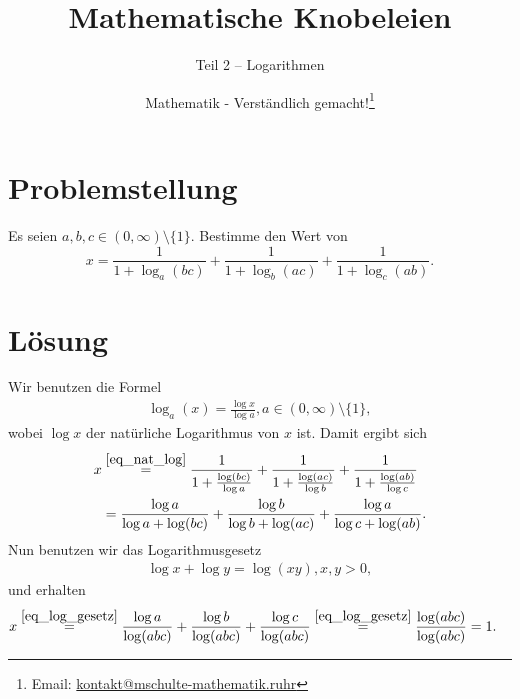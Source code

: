 \documentclass[]{scrartcl}
\title{Mathematische Knobeleien}
\subtitle{Teil 2 -- Logarithmen}
\author{Mathematik - Verständlich gemacht!\footnote{Email: \href{mailto:kontakt@mschulte-mathematik.ruhr}{kontakt@mschulte-mathematik.ruhr}}}
\begin{document}
\maketitle

\section*{Problemstellung}
Es seien $a,b,c \in (0,\infty) \setminus \{1\}$. Bestimme den Wert von
$$
x = \frac{1}{1+\log_a(bc)} + \frac{1}{1+\log_b(ac)} + \frac{1}{1+\log_c(ab)}.
$$

\section*{Lösung}
Wir benutzen die Formel 
\begin{align*}
	\log_a(x) = \frac{\log x}{\log a}, a \in (0,\infty) \setminus \{1\},
	\tag{$\ast$}
	\label{eq_nat_log}
\end{align*}
wobei $\log x$ der natürliche Logarithmus von $x$ ist.
Damit ergibt sich 
\begin{align*}
	x 
	& \overset{\eqref{eq_nat_log}}{=}
	\frac{1}{1+\frac{\log(bc)}{\log a}} +
	\frac{1}{1+\frac{\log(ac)}{\log b}} +
	\frac{1}{1+\frac{\log(ab)}{\log c}}
	\\ &= 
	\frac{\log a}{\log a + \log(bc)} +
	\frac{\log b}{\log b + \log(ac)} +
	\frac{\log a}{\log c + \log(ab)}.
\end{align*}
Nun benutzen wir das Logarithmusgesetz
\begin{align*}
	\log x + \log y = \log(xy)
	\tag{$\ast\ast$}, x,y > 0,
	\label{eq_log_gesetz}
\end{align*}
und erhalten
\begin{align*}
	x 
	& \overset{\eqref{eq_log_gesetz}}{=}
	\frac{\log a}{\log(abc)} +
	\frac{\log b}{\log(abc)} +
	\frac{\log c}{\log(abc)} 
	\overset{\eqref{eq_log_gesetz}}{=}
	\frac{\log(abc)}{\log(abc)} = 1.
\end{align*}
\end{document}
